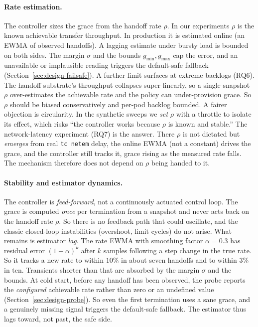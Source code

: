 \documentclass[AMA,Times1COL]{WileyNJDv5}
\begin{document}
\paragraph{Rate estimation.} The controller sizes the grace from the handoff rate $\rho$. In our
experiments $\rho$ is the known achievable transfer throughput. In production it is estimated online
(an EWMA of observed handoffs). A lagging estimate under bursty load is bounded on both sides. The
margin $\sigma$ and the bounds $g_{\min},g_{\max}$ cap the error, and an unavailable or implausible
reading triggers the default-safe fallback (Section~\ref{sec:design-failsafe}). A further limit
surfaces at extreme backlogs (RQ6). The handoff substrate's throughput collapses super-linearly, so a
single-snapshot $\rho$ over-estimates the achievable rate and the policy can under-provision grace. So
$\rho$ should be biased conservatively and per-pod backlog bounded. A fairer objection is circularity.
In the synthetic sweeps we \emph{set} $\rho$ with a throttle to isolate its effect, which risks ``the
controller works because $\rho$ is known and stable.'' The network-latency experiment (RQ7) is the
answer. There $\rho$ is not dictated but \emph{emerges} from real \texttt{tc netem} delay, the online
EWMA (not a constant) drives the grace, and the controller still tracks it, grace rising as the measured
rate falls. The mechanism therefore does not depend on $\rho$ being handed to it.

\paragraph{Stability and estimator dynamics.} The controller is \emph{feed-forward}, not a
continuously actuated control loop. The grace is computed \emph{once} per termination from a snapshot
and never acts back on the handoff rate $\rho$. So there is no feedback path that could oscillate, and
the classic closed-loop instabilities (overshoot, limit cycles) do not arise. What remains is estimator
\emph{lag}. The rate EWMA with smoothing factor $\alpha=0.3$ has residual error $(1-\alpha)^k$ after
$k$ samples following a step change in the true rate. So it tracks a new rate to within $10\%$ in about
seven handoffs and to within $3\%$ in ten. Transients shorter than that are absorbed by the margin
$\sigma$ and the bounds. At cold start, before any handoff has been observed, the probe reports the
\emph{configured} achievable rate rather than zero or an undefined value
(Section~\ref{sec:design-probe}). So even the first termination uses a sane grace, and a genuinely
missing signal triggers the default-safe fallback. The estimator thus lags toward, not past, the safe
side.
\end{document}
